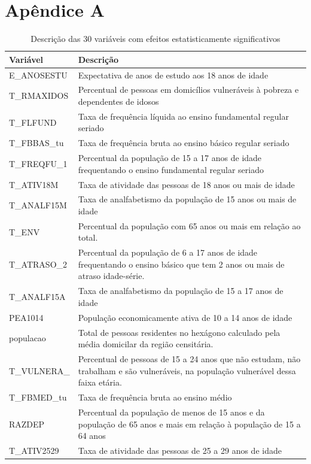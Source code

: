 \section*{Apêndice A}
\label{apendice:variaveis}

\begin{table}[h]
\centering
\caption{Descrição das 30 variáveis com efeitos estatisticamente significativos}
\label{tab:variaveis}
\begin{tabularx}{\textwidth}{lX}
\toprule
\textbf{Variável} & \textbf{Descrição} \\
\midrule
E\_ANOSESTU & Expectativa de anos de estudo aos 18 anos de idade \\
T\_RMAXIDOS & Percentual de pessoas em domicílios vulneráveis à pobreza e dependentes de idosos \\
T\_FLFUND & Taxa de frequência líquida ao ensino fundamental regular seriado\\
T\_FBBAS\_tu & Taxa de frequência bruta ao ensino básico regular seriado\\
T\_FREQFU\_1 & Percentual da população de 15 a 17 anos de idade frequentando o ensino fundamental regular seriado\\
T\_ATIV18M & Taxa de atividade das pessoas de 18 anos ou mais de idade \\
T\_ANALF15M & Taxa de analfabetismo da população de 15 anos ou mais de idade \\
T\_ENV & Percentual da população com 65 anos ou mais em relação ao total. \\
T\_ATRASO\_2 & Percentual da população de 6 a 17 anos de idade frequentando o ensino básico que tem 2 anos ou mais de atraso idade-série. \\
T\_ANALF15A & Taxa de analfabetismo da população de 15 a 17 anos de idade\\
PEA1014 & População economicamente ativa de 10 a 14 anos de idade \\
populacao & Total de pessoas residentes no hexágono calculado pela média domicilar da região censitária.\\
T\_VULNERA\_ & Percentual de pessoas de 15 a 24 anos que não estudam, não trabalham e são vulneráveis, na população vulnerável dessa faixa etária.\\
T\_FBMED\_tu & Taxa de frequência bruta ao ensino médio\\
RAZDEP & Percentual da população de menos de 15 anos e da população de 65 anos e mais em relação à população de 15 a 64 anos\\
T\_ATIV2529 & Taxa de atividade das pessoas de 25 a 29 anos de idade\\

\end{tabularx}
\end{table}
